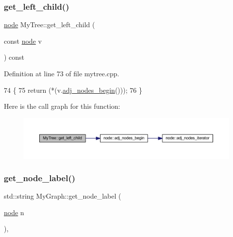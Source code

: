 \subsubsection{\texorpdfstring{get\+\_\+left\+\_\+child()}{get\_left\_child()}}
{\footnotesize\ttfamily \mbox{\hyperlink{classnode}{node}} My\+Tree\+::get\+\_\+left\+\_\+child (\begin{DoxyParamCaption}\item[{const \mbox{\hyperlink{classnode}{node}}}]{v }\end{DoxyParamCaption}) const}



Definition at line 73 of file mytree.\+cpp.


\begin{DoxyCode}
74 \{
75     \textcolor{keywordflow}{return} (*(v.\mbox{\hyperlink{classnode_a6cd2febf910bc6572c4aecba6278b100}{adj\_nodes\_begin}}()));
76 \}
\end{DoxyCode}
Here is the call graph for this function\+:\nopagebreak
\begin{figure}[H]
\begin{center}
\leavevmode
\includegraphics[width=350pt]{class_my_tree_ad24d047e2da5b363401a74977cde423c_cgraph}
\end{center}
\end{figure}
\mbox{\label{class_my_graph_ab92ebd7632157e681a6a7d7873841de7}} 
\subsubsection{\texorpdfstring{get\+\_\+node\+\_\+label()}{get\_node\_label()}}
{\footnotesize\ttfamily std\+::string My\+Graph\+::get\+\_\+node\+\_\+label (\begin{DoxyParamCaption}\item[{\mbox{\hyperlink{classnode}{node}}}]{n }\end{DoxyParamCaption})\hspace{0.3cm}{\ttfamily [inline]}, {\ttfamily [inherited]}}



